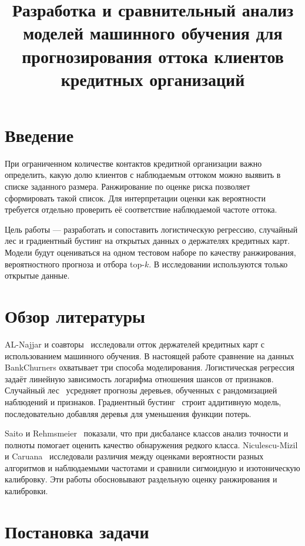 \documentclass{misisarticle}
\title{Разработка и сравнительный анализ моделей машинного обучения для прогнозирования оттока клиентов кредитных организаций}
\begin{document}
\maketitle

\section{Введение}

При ограниченном количестве контактов кредитной организации важно определить, какую долю клиентов с наблюдаемым оттоком можно выявить в списке заданного размера. Ранжирование по оценке риска позволяет сформировать такой список. Для интерпретации оценки как вероятности требуется отдельно проверить её соответствие наблюдаемой частоте оттока.

Цель работы — разработать и сопоставить логистическую регрессию, случайный лес и градиентный бустинг на открытых данных о держателях кредитных карт. Модели будут оцениваться на одном тестовом наборе по качеству ранжирования, вероятностного прогноза и отбора top-$k$. В исследовании используются только открытые данные.

\section{Обзор литературы}

AL-Najjar и соавторы~\cite{alnajjar} исследовали отток держателей кредитных карт с использованием машинного обучения. В настоящей работе сравнение на данных BankChurners охватывает три способа моделирования. Логистическая регрессия~\cite{cox} задаёт линейную зависимость логарифма отношения шансов от признаков. Случайный лес~\cite{breiman} усредняет прогнозы деревьев, обученных с рандомизацией наблюдений и признаков. Градиентный бустинг~\cite{friedman} строит аддитивную модель, последовательно добавляя деревья для уменьшения функции потерь.

Saito и Rehmsmeier~\cite{saito} показали, что при дисбалансе классов анализ точности и полноты помогает оценить качество обнаружения редкого класса. Niculescu-Mizil и Caruana~\cite{niculescu} исследовали различия между оценками вероятности разных алгоритмов и наблюдаемыми частотами и сравнили сигмоидную и изотоническую калибровку. Эти работы обосновывают раздельную оценку ранжирования и калибровки.

\section{Постановка задачи}
\end{document}

